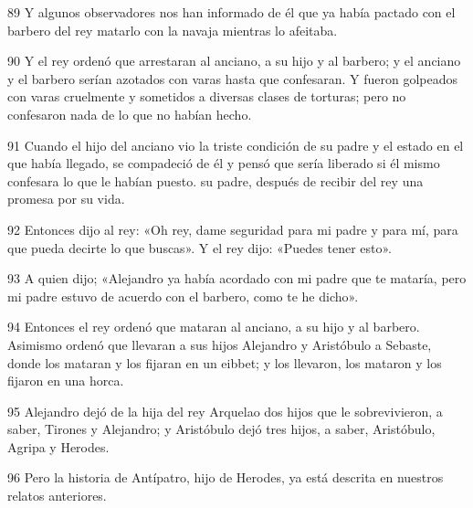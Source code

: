 \par 89 Y algunos observadores nos han informado de él que ya había pactado con el barbero del rey matarlo con la navaja mientras lo afeitaba.

\par 90 Y el rey ordenó que arrestaran al anciano, a su hijo y al barbero; y el anciano y el barbero serían azotados con varas hasta que confesaran. Y fueron golpeados con varas cruelmente y sometidos a diversas clases de torturas; pero no confesaron nada de lo que no habían hecho.

\par 91 Cuando el hijo del anciano vio la triste condición de su padre y el estado en el que había llegado, se compadeció de él y pensó que sería liberado si él mismo confesara lo que le habían puesto. su padre, después de recibir del rey una promesa por su vida.

\par 92 Entonces dijo al rey: «Oh rey, dame seguridad para mi padre y para mí, para que pueda decirte lo que buscas». Y el rey dijo: «Puedes tener esto».

\par 93 A quien dijo; «Alejandro ya había acordado con mi padre que te mataría, pero mi padre estuvo de acuerdo con el barbero, como te he dicho».

\par 94 Entonces el rey ordenó que mataran al anciano, a su hijo y al barbero. Asimismo ordenó que llevaran a sus hijos Alejandro y Aristóbulo a Sebaste, donde los mataran y los fijaran en un eibbet; y los llevaron, los mataron y los fijaron en una horca.

\par 95 Alejandro dejó de la hija del rey Arquelao dos hijos que le sobrevivieron, a saber, Tirones y Alejandro; y Aristóbulo dejó tres hijos, a saber, Aristóbulo, Agripa y Herodes.

\par 96 Pero la historia de Antípatro, hijo de Herodes, ya está descrita en nuestros relatos anteriores.

